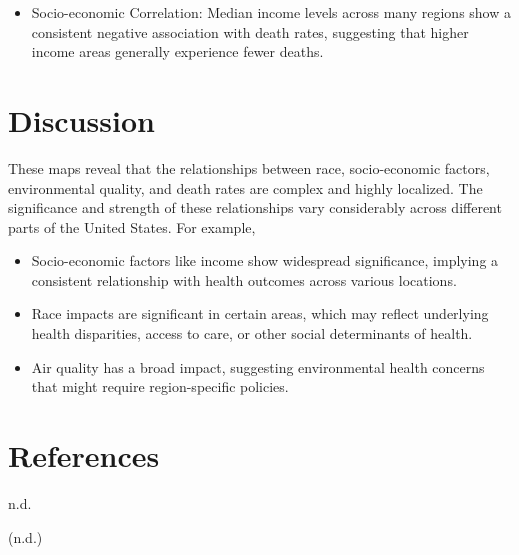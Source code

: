 \documentclass[
]{article}
\providecommand{\tightlist}{%
  \setlength{\itemsep}{0pt}\setlength{\parskip}{0pt}}\usepackage{longtable,booktabs,array}
\newlength{\cslhangindent}
\newenvironment{CSLReferences}[2] %
 {\begin{list}{}{%
  \setlength{\itemindent}{0pt}
  \setlength{\leftmargin}{0pt}
  \setlength{\parsep}{0pt}
  \ifodd #1
   \setlength{\leftmargin}{\cslhangindent}
   \setlength{\itemindent}{-1\cslhangindent}
  \fi
  \setlength{\itemsep}{#2\baselineskip}}}
 {\end{list}}
\begin{document}
\begin{itemize}
\tightlist
\item
  Socio-economic Correlation: Median income levels across many regions
  show a consistent negative association with death rates, suggesting
  that higher income areas generally experience fewer deaths.
\end{itemize}

\section{Discussion}\label{discussion}

These maps reveal that the relationships between race, socio-economic
factors, environmental quality, and death rates are complex and highly
localized. The significance and strength of these relationships vary
considerably across different parts of the United States. For example,~

\begin{itemize}
\tightlist
\item
  Socio-economic factors like income show widespread significance,
  implying a consistent relationship with health outcomes across various
  locations.
\end{itemize}

\begin{itemize}
\tightlist
\item
  Race impacts are significant in certain areas, which may reflect
  underlying health disparities, access to care, or other social
  determinants of health.
\end{itemize}

\begin{itemize}
\tightlist
\item
  Air quality has a broad impact, suggesting environmental health
  concerns that might require region-specific policies.~
\end{itemize}

\newpage{}

\section*{References}\label{references}

\label{refs}
\begin{CSLReferences}{1}{0}
n.d.

\end{CSLReferences}

(n.d.)
\end{document}
